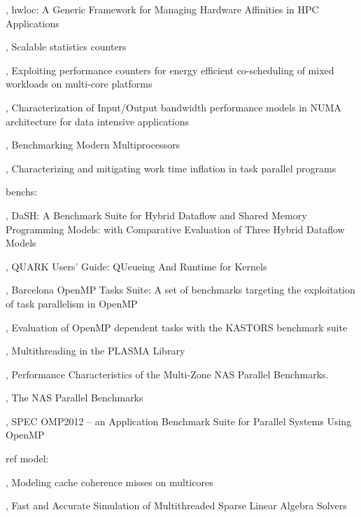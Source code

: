 \cite{Broquedis2010}, hwloc: {A} Generic Framework for Managing Hardware Affinities in {HPC} Applications


\cite{Dice2013}, Scalable statistics counters

\cite{Libutti2014}, Exploiting performance counters for energy efficient co-scheduling of mixed workloads on multi-core platforms

\cite{Li2013}, Characterization of Input/Output bandwidth performance models in NUMA architecture for data intensive applications

\cite{Bienia2011}, Benchmarking Modern Multiprocessors

\cite{Olivier2013}, Characterizing and mitigating work time inflation in task parallel programs

benchs:

\cite{Gajinov2014}, DaSH: A Benchmark Suite for Hybrid Dataflow and Shared Memory Programming Models: with Comparative Evaluation of Three Hybrid Dataflow Models

\cite{YarKhan2011}, QUARK Users' Guide: QUeueing And Runtime for Kernels

\cite{Duran2009}, Barcelona OpenMP Tasks Suite: A set of benchmarks targeting the exploitation of task parallelism in OpenMP

\cite{Virouleau2014}, Evaluation of OpenMP dependent tasks with the KASTORS benchmark suite

\cite{Kurzak2013}, Multithreading in the PLASMA Library

\cite{Jin2004}, Performance Characteristics of the Multi-Zone NAS Parallel Benchmarks.

\cite{Bailey1994}, The NAS Parallel Benchmarks

\cite{Muller2012}, SPEC OMP2012 -- an Application Benchmark Suite for Parallel Systems Using OpenMP


ref model:

\cite{Pan2014}, Modeling cache coherence misses on multicores

\cite{Stanisic2016}, Fast and Accurate Simulation of Multithreaded Sparse Linear Algebra Solvers

